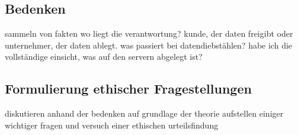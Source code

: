 \documentclass[letterpaper, 12pt]{article}
\let\tempsubsection\subsection
\renewcommand\subsection[1]{\vspace{0cm}\tempsubsection{#1}\vspace{0cm}}
\begin{document}
\subsection{Bedenken}

sammeln von fakten \newline
wo liegt die verantwortung? kunde, der daten freigibt oder unternehmer, der daten ablegt. was passiert bei datendiebstählen? habe ich die vollständige einsicht, was auf den servern abgelegt ist?

\subsection{Formulierung ethischer Fragestellungen}

diskutieren anhand der bedenken auf grundlage der theorie \newline
aufstellen einiger wichtiger fragen und versuch einer ethischen urteilsfindung

\clearpage



\lstlistoflistings
\listoffigures
\end{document}
